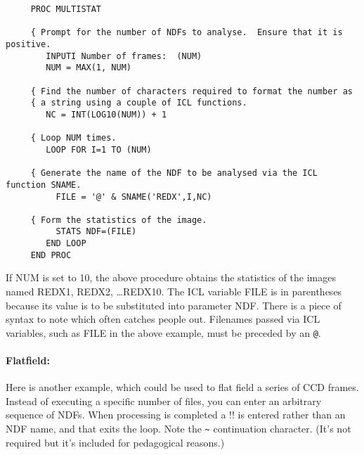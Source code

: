\begin{small}
\begin{verbatim}
     PROC MULTISTAT

     { Prompt for the number of NDFs to analyse.  Ensure that it is positive.
        INPUTI Number of frames:  (NUM)
        NUM = MAX(1, NUM)

     { Find the number of characters required to format the number as
     { a string using a couple of ICL functions.
        NC = INT(LOG10(NUM)) + 1

     { Loop NUM times.
        LOOP FOR I=1 TO (NUM)

     { Generate the name of the NDF to be analysed via the ICL function SNAME.
          FILE = '@' & SNAME('REDX',I,NC)

     { Form the statistics of the image.
          STATS NDF=(FILE)
        END LOOP
     END PROC
\end{verbatim}
\end{small}

If NUM is set to 10, the above procedure obtains the statistics of the images
named REDX1, REDX2, \dots REDX10.
The {\small ICL} variable FILE is in parentheses because its value is to be
substituted into parameter NDF.
There is a piece of syntax to note which often catches people out.
Filenames passed via {\small ICL} variables, such as FILE in the above example,
must be preceded by an {\tt @}.

\paragraph{Flatfield:}\hfill

Here is another example, which could be used to flat field a series of CCD
frames.
Instead of executing a specific number of files, you can enter an arbitrary
sequence of NDFs.
When processing is completed a !! is entered rather than an NDF name, and that
exits the loop.
Note the {\tt \~{}} continuation character.
(It's not required but it's included for pedagogical reasons.)
\pagebreak[3]

